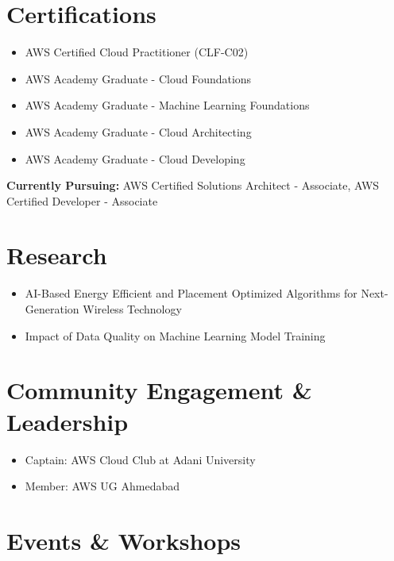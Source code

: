 \documentclass[10pt,a4paper]{article}
\begin{document}
\section*{Certifications}
\begin{itemize}
    \item AWS Certified Cloud Practitioner (CLF-C02)
    \item AWS Academy Graduate - Cloud Foundations
    \item AWS Academy Graduate - Machine Learning Foundations
    \item AWS Academy Graduate - Cloud Architecting
    \item AWS Academy Graduate - Cloud Developing
\end{itemize}
\textbf{Currently Pursuing:} AWS Certified Solutions Architect - Associate, AWS Certified Developer - Associate

\section*{Research}
\begin{itemize}
    \item AI-Based Energy Efficient and Placement Optimized Algorithms for Next-Generation Wireless Technology
    \item Impact of Data Quality on Machine Learning Model Training
\end{itemize}

\section*{Community Engagement \& Leadership}
\begin{itemize}
    \item Captain: AWS Cloud Club at Adani University
    \item Member: AWS UG Ahmedabad
\end{itemize}

\section*{Events \& Workshops}
\end{document}
